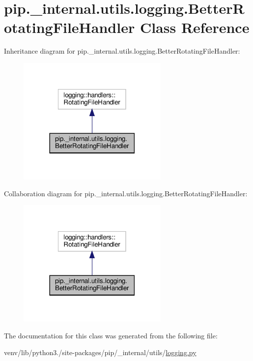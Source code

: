 \hypertarget{classpip_1_1__internal_1_1utils_1_1logging_1_1BetterRotatingFileHandler}{}\section{pip.\+\_\+internal.\+utils.\+logging.\+Better\+Rotating\+File\+Handler Class Reference}
\label{classpip_1_1__internal_1_1utils_1_1logging_1_1BetterRotatingFileHandler}


Inheritance diagram for pip.\+\_\+internal.\+utils.\+logging.\+Better\+Rotating\+File\+Handler\+:
\nopagebreak
\begin{figure}[H]
\begin{center}
\leavevmode
\includegraphics[width=209pt]{classpip_1_1__internal_1_1utils_1_1logging_1_1BetterRotatingFileHandler__inherit__graph}
\end{center}
\end{figure}


Collaboration diagram for pip.\+\_\+internal.\+utils.\+logging.\+Better\+Rotating\+File\+Handler\+:
\nopagebreak
\begin{figure}[H]
\begin{center}
\leavevmode
\includegraphics[width=209pt]{classpip_1_1__internal_1_1utils_1_1logging_1_1BetterRotatingFileHandler__coll__graph}
\end{center}
\end{figure}


The documentation for this class was generated from the following file\+:\begin{DoxyCompactItemize}
\item 
venv/lib/python3./site-\/packages/pip/\+\_\+internal/utils/\hyperlink{logging_8py}{logging.\+py}\end{DoxyCompactItemize}
